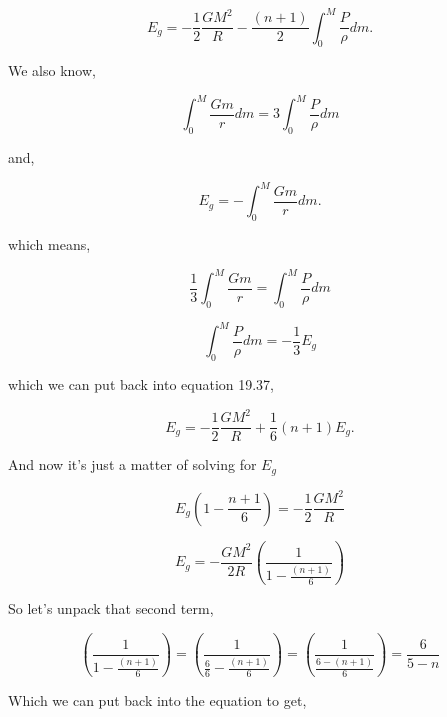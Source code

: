 \documentclass[12pt]{article}
\begin{document}
\begin{equation}
E_g = -\frac{1}{2} \frac{GM^2}{R} - \frac{\left( n +1 \right)}{2}\int_0^M \frac{P}{\rho}dm.
\end{equation}

\noindent We also know,

\begin{equation}
\int_0^M \frac{Gm}{r}dm = 3\int_0^M \frac{P}{\rho}dm
\end{equation}

\noindent and, 

\begin{equation}
E_g = -\int_0^M \frac{Gm}{r}dm.
\end{equation}

\noindent which means,

\begin{equation}
\frac{1}{3}\int_0^M\frac{Gm}{r} = \int_0^M \frac{P}{\rho}dm
\end{equation}

\begin{equation}
\int_0^M \frac{P}{\rho}dm = -\frac{1}{3}E_g
\end{equation}

\noindent which we can put back into equation 19.37,

\begin{equation}
E_g = -\frac{1}{2}\frac{GM^2}{R} + \frac{1}{6}\left(n + 1 \right)E_g.
\end{equation}

\noindent And now it's just a matter of solving for $E_g$

\begin{equation}
E_g\left( 1 - \frac{n+1}{6} \right) = -\frac{1}{2}\frac{GM^2}{R}
\end{equation}

\begin{equation}
E_g = -\frac{GM^2}{2R}\left( \frac{1}{1 - \frac{\left( n + 1\right)}{6}} \right)
\end{equation}

\noindent So let's unpack that second term,

\begin{equation}
\left( \frac{1}{1 - \frac{\left( n + 1\right)}{6}} \right) = \left( \frac{1}{\frac{6}{6} - \frac{\left( n + 1\right)}{6}} \right) = \left( \frac{1}{\frac{6 - \left(n + 1 \right)}{6}}\right) = \frac{6}{5 -n}
\end{equation}

\noindent Which we can put back into the equation to get,
\end{document}
